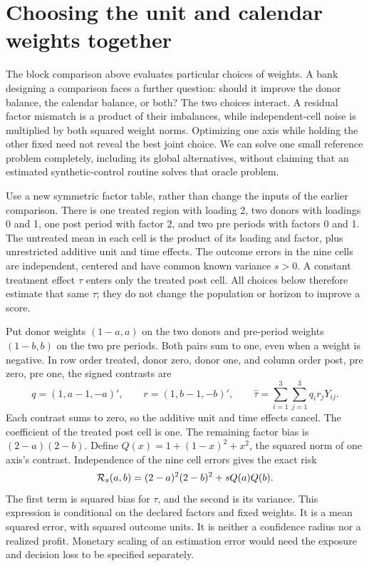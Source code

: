 \section{Choosing the unit and calendar weights together}
\label{exec17:s6-joint}

The block comparison above evaluates particular choices of weights. A bank
designing a comparison faces a further question: should it improve the donor
balance, the calendar balance, or both? The two choices interact. A residual
factor mismatch is a product of their imbalances, while independent-cell
noise is multiplied by both squared weight norms. Optimizing one axis while
holding the other fixed need not reveal the best joint choice. We can solve
one small reference problem completely, including its global alternatives,
without claiming that an estimated synthetic-control routine solves that
oracle problem.~\citep{exec17_s6_extension}

Use a new symmetric factor table, rather than change the inputs of the earlier
comparison. There is one treated region with loading 2, two donors with
loadings 0 and 1, one post period with factor 2, and two pre periods with
factors 0 and 1. The untreated mean in each cell is the product of its loading
and factor, plus unrestricted additive unit and time effects. The outcome
errors in the nine cells are independent, centered and have common known
variance $s>0$. A constant treatment effect $\tau$ enters only the treated
post cell. All choices below therefore estimate that same $\tau$; they do
not change the population or horizon to improve a score.

Put donor weights $(1-a,a)$ on the two donors and pre-period weights
$(1-b,b)$ on the two pre periods. Both pairs sum to one, even when a weight
is negative. In row order treated, donor zero, donor one, and column order
post, pre zero, pre one, the signed contrasts are
\begin{equation}
 q=(1,a-1,-a)',\qquad r=(1,b-1,-b)',\qquad
 \widehat\tau=\sum_{i=1}^3\sum_{j=1}^3q_i r_jY_{ij}.
 \label{exec17:s6-joint-contrast}
\end{equation}
Each contrast sums to zero, so the additive unit and time effects cancel.
The coefficient of the treated post cell is one. The remaining factor bias
is $(2-a)(2-b)$. Define $Q(x)=1+(1-x)^2+x^2$, the squared norm of one
axis's contrast. Independence of the nine cell errors gives the exact risk
\begin{equation}
 {\cal R}_s(a,b)
  =(2-a)^2(2-b)^2+sQ(a)Q(b).
 \label{exec17:s6-joint-risk}
\end{equation}
The first term is squared bias for $\tau$, and the second is its variance.
This expression is conditional on the declared factors and fixed weights.
It is a mean squared error, with squared outcome units. It is neither a
confidence radius nor a realized profit. Monetary scaling of an estimation
error would need the exposure and decision loss to be specified separately.

